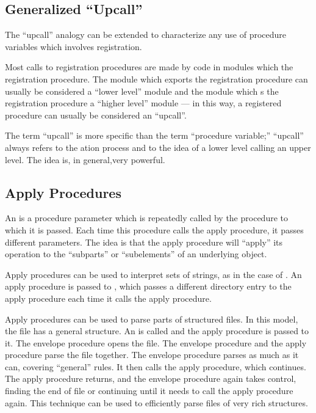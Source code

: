 \subsection{Generalized ``Upcall''}

The ``upcall'' analogy can be extended to characterize any use of procedure
variables which involves registration.

Most calls to registration procedures are made by code in modules which
 the registration procedure.  The module which exports the
registration procedure can usually be considered a ``lower level'' module
and the module which s the registration procedure a ``higher
level'' module --- in this way, a registered procedure can usually be considered
an ``upcall''.

The term ``upcall'' is more specific than the term ``procedure variable;''
``upcall'' always refers to the ation process and 
to the idea of a lower level calling an upper level.  The idea
is, in general,very powerful.

\subsection{Apply Procedures}

An  is a procedure parameter which is repeatedly
called by the procedure to which it is passed.  Each time this procedure calls
the apply procedure, it passes different parameters.  The idea is that the apply
procedure will ``apply'' its operation to the ``subparts'' or ``subelements''
of an underlying object.

Apply procedures can be used to interpret sets of strings, as in the case of
.  An apply procedure is passed to , which  
passes 
a different
directory entry to the apply procedure each time it calls the apply
procedure.

Apply procedures can be used to parse parts of structured files.  In this
model, the file has a general structure.  An  is
called and the apply procedure is passed to it.  The envelope procedure opens 
the file.
The envelope procedure and the apply procedure parse the file together.  The
envelope procedure parses as much as it can, covering ``general'' rules.  It
then calls the apply procedure, which continues.  The apply procedure returns,
and the envelope procedure again takes control, finding the end of file or
continuing until it needs to call the apply procedure again.
This technique can be used to efficiently parse files of very rich structures.

